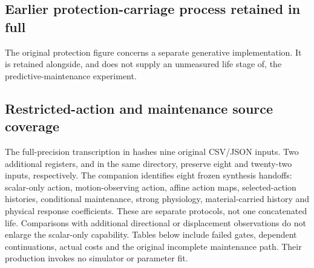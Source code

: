 \subsection*{Earlier protection-carriage process retained in full}
The original protection figure concerns a separate generative implementation. It is retained alongside, and does not supply an unmeasured life stage of, the predictive-maintenance experiment.

\clearpage
\subsection*{Restricted-action and maintenance source coverage}
The full-precision transcription in  hashes nine original CSV/JSON inputs. Two additional registers,  and  in the same directory, preserve eight and twenty-two inputs, respectively. The companion  identifies eight frozen synthesis handoffs: scalar-only action, motion-observing action, affine action maps, selected-action histories, conditional maintenance, strong physiology, material-carried history and physical response coefficients. These are separate protocols, not one concatenated life. Comparisons with additional directional or displacement observations do not enlarge the scalar-only capability. Tables below include failed gates, dependent continuations, actual costs and the original incomplete maintenance path. Their production invokes no simulator or parameter fit.









